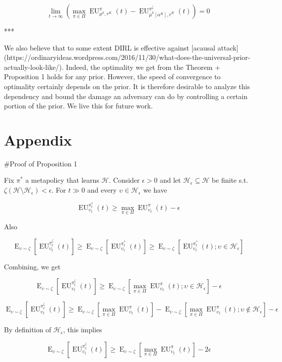 \documentclass[a4paper]{article}
\newcommand{\E}{\operatorname{E}}
\newcommand{\Hy}{\mathcal{H}}
\newcommand{\EU}{\operatorname{EU}}
\begin{document}
$$\lim_{t \rightarrow \infty} (\max_{\pi \in \Pi} \EU_{\mu^k,r^K}^\pi(t) - \EU_{\bar{\mu}^k[\alpha^K],\bar{r}^K}^{\pi^\zeta}(t)) = 0$$

***

We also believe that to some extent DIRL is effective against [acausal attack](https://ordinaryideas.wordpress.com/2016/11/30/what-does-the-universal-prior-actually-look-like/). Indeed, the optimality we get from the Theorem + Proposition 1 holds for any prior. However, the speed of convergence to optimality certainly depends on the prior.  It is therefore desirable to analyze this dependency and bound the damage an adversary can do by controlling a certain portion of the prior. We live this for future work.

\section{Appendix}

\#Proof of Proposition 1

Fix $\pi^*$ a metapolicy that learns $\Hy$. Consider $\epsilon > 0$ and let $\Hy_\epsilon \subseteq \Hy$ be finite s.t. $\zeta(\Hy \setminus \Hy_\epsilon) < \epsilon$. For $t \gg 0$ and every $\upsilon \in \Hy_\epsilon$ we have

$$\EU_{\upsilon_t}^{\pi^*_t}(t) \geq \max_{\pi \in \Pi} \EU_{\upsilon_t}^{\pi}(t) - \epsilon$$

Also

$$\E_{\upsilon \sim \zeta}[\EU_{\upsilon_t}^{\pi^\zeta_t}(t)] \geq \E_{\upsilon \sim \zeta}[\EU_{\upsilon_t}^{\pi^*_t}(t)] \geq \E_{\upsilon \sim \zeta}[\EU_{\upsilon_t}^{\pi^*_t}(t); \upsilon \in \Hy_\epsilon]$$

Combining, we get

$$\E_{\upsilon \sim \zeta}[\EU_{\upsilon_t}^{\pi^\zeta_t}(t)] \geq \E_{\upsilon \sim \zeta}[\max_{\pi \in \Pi} \EU_{\upsilon_t}^{\pi}(t); \upsilon \in \Hy_\epsilon] - \epsilon$$

$$\E_{\upsilon \sim \zeta}[\EU_{\upsilon_t}^{\pi^\zeta_t}(t)] \geq \E_{\upsilon \sim \zeta}[\max_{\pi \in \Pi} \EU_{\upsilon_t}^{\pi}(t)] -  \E_{\upsilon \sim \zeta}[\max_{\pi \in \Pi} \EU_{\upsilon_t}^{\pi}(t); \upsilon \not\in \Hy_\epsilon] - \epsilon$$

By definition of $\Hy_\epsilon$, this implies

$$\E_{\upsilon \sim \zeta}[\EU_{\upsilon_t}^{\pi^\zeta_t}(t)] \geq \E_{\upsilon \sim \zeta}[\max_{\pi \in \Pi} \EU_{\upsilon_t}^{\pi}(t)] -  2\epsilon$$
\end{document}
